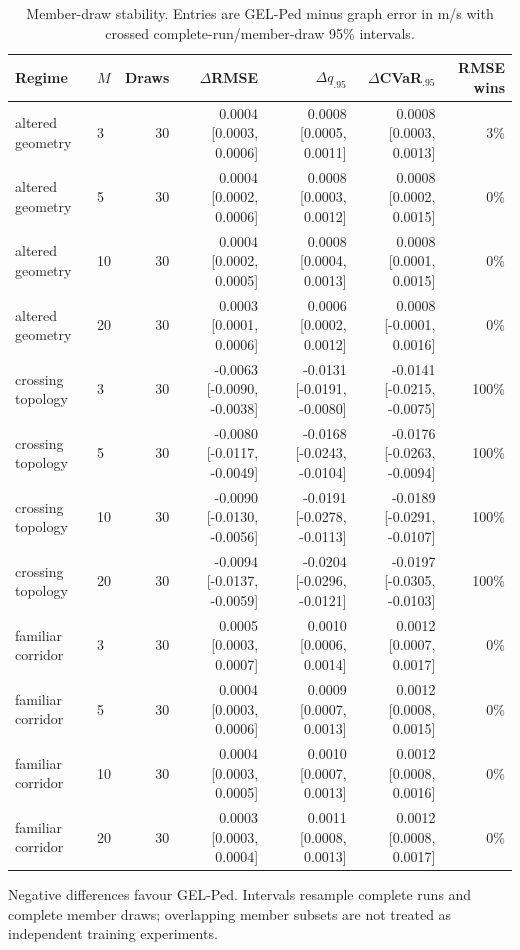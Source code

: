 \begin{table}[!htbp]
\centering
\caption{Member-draw stability. Entries are GEL-Ped minus graph error in m/s with crossed complete-run/member-draw 95\% intervals.}
\label{tab:r3-draw-stability}
\scriptsize
\setlength{\tabcolsep}{2.4pt}
\renewcommand{\arraystretch}{1.08}
\begin{tabular}{llrrrrr}
\toprule
Regime & $M$ & Draws & $\Delta$RMSE & $\Delta q_{.95}$ & $\Delta$CVaR$_{.95}$ & RMSE wins \\
\midrule
altered geometry & 3 & 30 & 0.0004 [0.0003, 0.0006] & 0.0008 [0.0005, 0.0011] & 0.0008 [0.0003, 0.0013] & 3\% \\
altered geometry & 5 & 30 & 0.0004 [0.0002, 0.0006] & 0.0008 [0.0003, 0.0012] & 0.0008 [0.0002, 0.0015] & 0\% \\
altered geometry & 10 & 30 & 0.0004 [0.0002, 0.0005] & 0.0008 [0.0004, 0.0013] & 0.0008 [0.0001, 0.0015] & 0\% \\
altered geometry & 20 & 30 & 0.0003 [0.0001, 0.0006] & 0.0006 [0.0002, 0.0012] & 0.0008 [-0.0001, 0.0016] & 0\% \\
crossing topology & 3 & 30 & -0.0063 [-0.0090, -0.0038] & -0.0131 [-0.0191, -0.0080] & -0.0141 [-0.0215, -0.0075] & 100\% \\
crossing topology & 5 & 30 & -0.0080 [-0.0117, -0.0049] & -0.0168 [-0.0243, -0.0104] & -0.0176 [-0.0263, -0.0094] & 100\% \\
crossing topology & 10 & 30 & -0.0090 [-0.0130, -0.0056] & -0.0191 [-0.0278, -0.0113] & -0.0189 [-0.0291, -0.0107] & 100\% \\
crossing topology & 20 & 30 & -0.0094 [-0.0137, -0.0059] & -0.0204 [-0.0296, -0.0121] & -0.0197 [-0.0305, -0.0103] & 100\% \\
familiar corridor & 3 & 30 & 0.0005 [0.0003, 0.0007] & 0.0010 [0.0006, 0.0014] & 0.0012 [0.0007, 0.0017] & 0\% \\
familiar corridor & 5 & 30 & 0.0004 [0.0003, 0.0006] & 0.0009 [0.0007, 0.0013] & 0.0012 [0.0008, 0.0015] & 0\% \\
familiar corridor & 10 & 30 & 0.0004 [0.0003, 0.0005] & 0.0010 [0.0007, 0.0013] & 0.0012 [0.0008, 0.0016] & 0\% \\
familiar corridor & 20 & 30 & 0.0003 [0.0003, 0.0004] & 0.0011 [0.0008, 0.0013] & 0.0012 [0.0008, 0.0017] & 0\% \\
\bottomrule
\end{tabular}
\par\vspace{2pt}\footnotesize Negative differences favour GEL-Ped. Intervals resample complete runs and complete member draws; overlapping member subsets are not treated as independent training experiments.
\end{table}
